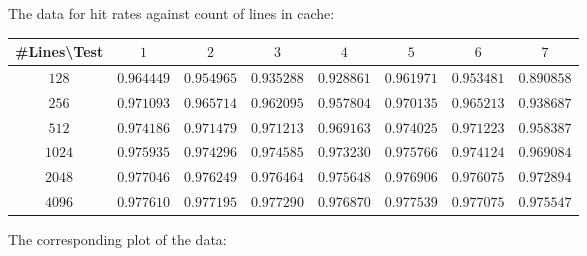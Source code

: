 \documentclass[11pt]{article}
\begin{document}
\begin{enumerate}[left= \parindent, label = \textbf{\arabic*.}]
    The data for hit rates against count of lines in cache:
    \begin{center}
        \begin{tabular}[h]{|c|c|c|c|c|c|c|c|}
            \hline\textbf{\#Lines\textbackslash Test} & $1$ & $2$ & $3$ & $4$ & $5$ & $6$ & $7$\\            
            \hline $128$ & $0.964449$ & $0.954965
            $ & $0.935288$ & $0.928861
            $ & $0.961971
            $ & $0.953481
            $ & $0.890858
            $\\
            \hline $256$ & $0.971093
            $ & $0.965714
            $ & $0.962095$ & $0.957804
            $ & $0.970135
            $ & $0.965213
            $ & $0.938687
            $\\
            \hline $512$ & $0.974186
            $ & $0.971479
            $ & $0.971213$ & $0.969163
            $ & $0.974025
            $ & $0.971223
            $ & $0.958387
            $\\
            \hline $1024$ & $0.975935
            $ & $0.974296
            $ & $0.974585
            $ & $0.97323
            0$ & $0.975766
            $ & $0.974124
            $ & $0.969084
            $\\
            \hline $2048$ & $0.977046
            $ & $0.976249
            $ & $0.976464
            $ & $0.975648
            $ & $0.976906
            $ & $0.976075
            $ & $0.972894
            $\\
            \hline $4096$ & $0.97761
            0$ & $0.977195
            $ & $0.97729
            0$ & $0.97687
            0$ & $0.977539$ & $0.977075
            $ & $0.975547
            $\\
            \hline
        \end{tabular}
    \end{center}
    The corresponding plot of the data:
    

\end{enumerate}
\end{document}
